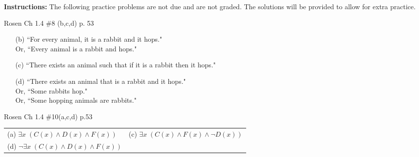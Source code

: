\documentclass[12pt,addpoints]{exam}
\begin{document}
\extrawidth{0.5in} \extrafootheight{-0in} \pagestyle{headandfoot}
\headrule 
{} \footrule 
{}

\noindent \textbf{Instructions:} The following practice problems are
not due and are not graded.  The solutions will be provided to allow
for extra practice.


\begin{questions}
\printanswers

\question Rosen Ch 1.4 \#8 (b,c,d) p. 53
    \ifprintanswers
        \vspace{-12pt}
    \fi
\begin{solution}
    \begin{itemize}[itemsep=0pt,parsep=0pt,topsep=0pt,partopsep=0pt]
        \item[(b)] ``For every animal, it is a rabbit and it hops." \\Or, ``Every animal is a rabbit and hops."
        \item[(c)] ``There exists an animal such that if it is a rabbit then it hops."
        \item[(d)] ``There exists an animal that is a rabbit and it hops." \\Or, ``Some rabbits hop." \\Or, ``Some hopping animals are rabbits."
    \end{itemize}
\end{solution}


\question Rosen Ch 1.4 \#10(a,c,d) p.53
    \ifprintanswers
        \vspace{-12pt}
    \fi
\begin{solution}
    \begin{tabular}{ll}
    	(a) $\exists x\; (C(x) \wedge D(x) \wedge F(x))$ 
    	 & (c) $\exists x\; (C(x) \wedge F(x) \wedge \neg D(x))$ \\
    	(d) $\neg \exists x\; (C(x) \wedge D(x) \wedge F(x))$
	\end{tabular}
\end{solution}



\end{questions}
\end{document}
